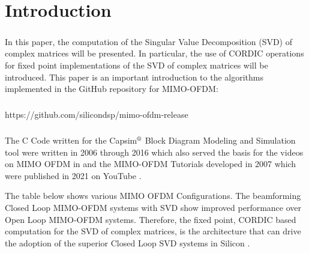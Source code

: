 \newpage
\tableofcontents
 \setcounter{tocdepth}{7}
\listoffigures

\newpage
\chapter{Introduction}



\paragraph{}
In this paper, the computation of the Singular Value Decomposition (SVD) of complex matrices will be presented. In particular, the use of CORDIC operations for fixed point implementations of the SVD of complex matrices will be introduced. This paper is an important introduction to the algorithms implemented in the GitHub repository for MIMO-OFDM:
\paragraph{}
https://github.com/silicondsp/mimo-ofdm-release
\paragraph{}
The C Code written for the Capsim$\textsuperscript{\textregistered}$ Block Diagram Modeling and Simulation tool were written in 2006 through 2016 which also served the basis for the videos on MIMO OFDM in \cite{capsim-mimo} and the MIMO-OFDM Tutorials developed  in 2007  which were published in 2021 on YouTube \cite{ardalan}.

The table below shows various MIMO OFDM Configurations. The beamforming Closed Loop MIMO-OFDM systems with SVD show improved performance over Open Loop MIMO-OFDM systems. Therefore, the fixed point, CORDIC based computation for the SVD of complex matrices, is the architecture that can drive the adoption of the superior Closed Loop SVD systems in Silicon \cite{nasa-ardalan}.

